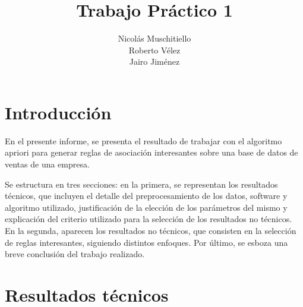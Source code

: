 \documentclass[]{article}
\title{Trabajo Práctico 1}
\author{Nicolás Muschitiello \\
	Roberto Vélez\\
	Jairo Jiménez
}
\begin{document}
	
	\maketitle
	
	\section{Introducción}
	
	En el presente informe, se presenta el resultado de trabajar con el algoritmo apriori \cite{Tan:2005:IDM:1095618} para generar reglas de asociación interesantes sobre una base de datos de ventas de una empresa.
	
	Se estructura en tres secciones: en la primera, se representan los resultados técnicos, que incluyen el detalle del preprocesamiento de los datos, software y algoritmo utilizado, justificación de la elección de los parámetros del mismo y explicación del criterio utilizado para la selección de los resultados no técnicos. En la segunda, aparecen los resultados no técnicos, que consisten en la selección de reglas interesantes, siguiendo distintos enfoques. Por último, se esboza una breve conclusión del trabajo realizado.
	
	
	\section{Resultados técnicos}
\end{document}
